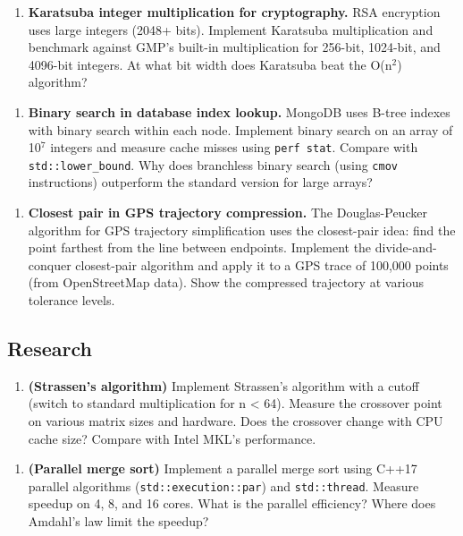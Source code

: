\begin{enumerate}
\item \textbf{Karatsuba integer multiplication for cryptography.} RSA encryption uses large integers (2048+ bits). Implement Karatsuba multiplication and benchmark against GMP's built-in multiplication for 256-bit, 1024-bit, and 4096-bit integers. At what bit width does Karatsuba beat the O(n$^{2}$) algorithm?
\end{enumerate}

\begin{enumerate}
\item \textbf{Binary search in database index lookup.} MongoDB uses B-tree indexes with binary search within each node. Implement binary search on an array of 10$^{7}$ integers and measure cache misses using \texttt{perf stat}. Compare with \texttt{std::lower\_bound}. Why does branchless binary search (using \texttt{cmov} instructions) outperform the standard version for large arrays?
\end{enumerate}

\begin{enumerate}
\item \textbf{Closest pair in GPS trajectory compression.} The Douglas-Peucker algorithm for GPS trajectory simplification uses the closest-pair idea: find the point farthest from the line between endpoints. Implement the divide-and-conquer closest-pair algorithm and apply it to a GPS trace of 100,000 points (from OpenStreetMap data). Show the compressed trajectory at various tolerance levels.
\end{enumerate}

\subsection{Research}

\begin{enumerate}
\item \textbf{(Strassen's algorithm)} Implement Strassen's algorithm with a cutoff (switch to standard multiplication for n < 64). Measure the crossover point on various matrix sizes and hardware. Does the crossover change with CPU cache size? Compare with Intel MKL's performance.
\end{enumerate}

\begin{enumerate}
\item \textbf{(Parallel merge sort)} Implement a parallel merge sort using C++17 parallel algorithms (\texttt{std::execution::par}) and \texttt{std::thread}. Measure speedup on 4, 8, and 16 cores. What is the parallel efficiency? Where does Amdahl's law limit the speedup?
\end{enumerate}

